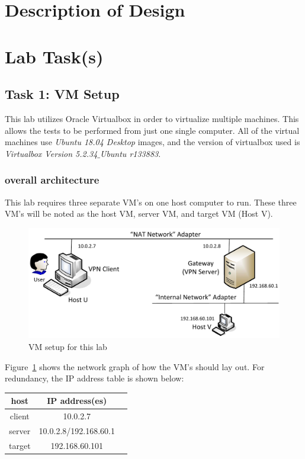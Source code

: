 \documentclass[12pt]{article}
\begin{document}
\section{Description of Design}





\clearpage
\section{Lab Task(s)}
\subsection{Task 1: VM Setup}
This lab utilizes Oracle Virtualbox in order to virtualize multiple machines. This allows the tests to be performed from just one single computer. All of the virtual machines use \emph{Ubuntu 18.04 Desktop} images, and the version of virtualbox used is \emph{Virtualbox Version 5.2.34$\_$Ubuntu r133883}.
\subsubsection{overall architecture}
This lab requires three separate VM's on one host computer to run. These three VM's will be noted as the host VM, server VM, and target VM (Host V).
\begin{figure}[H]
    \begin{center}
        \includegraphics[scale=0.35]{t1_1.png}
    \end{center}{}
    \caption{VM setup for this lab}
    \label{fig:t1_1}
\end{figure}

Figure~\ref{fig:t1_1} shows the network graph of how the VM's should lay out. For redundancy, the IP address table is shown below:

\begin{center}
\begin{tabular}{ |c|c|c| } 
 \hline
 host & IP address(es) \\ 
 \hline
 client & 10.0.2.7  \\ 
 server & 10.0.2.8/192.168.60.1  \\ 
 target & 192.168.60.101 \\
 \hline
\end{tabular}
\end{center}
\end{document}
